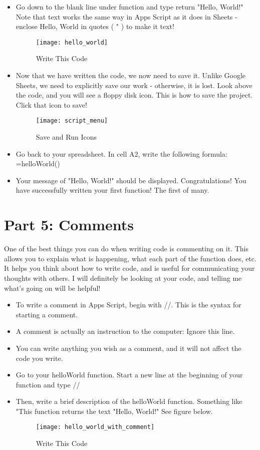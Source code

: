 \documentclass{article}
\begin{document}
\begin{itemize}
	\item Go down to the blank line under function and type return "Hello, World!"  Note that text works the same way in Apps Script as it does in Sheets - enclose Hello, World in quotes ( " ) to make it text!
	\begin{figure}[H]
  		\centering
  		\texttt{[image: hello\_world]}
  		\caption{Write This Code}
	\end{figure} 
	\item Now that we have written the code, we now need to save it.  Unlike Google Sheets, we need to explicitly save our work - otherwise, it is lost.  Look above the code, and you will see a floppy disk icon.  This is how to save the project.  Click that icon to save!
	\begin{figure}[H]
  \centering
  \texttt{[image: script\_menu]}
  \caption{Save and Run Icons}
\end{figure} 
	\item Go back to your spreadsheet.  In cell A2, write the following formula:  =helloWorld()
	\item Your message of "Hello, World!" should be displayed.  Congratulations!  You have successfully written your first function!  The first of many. 
\end{itemize}

\section*{Part 5: Comments}
One of the best things you can do when writing code is commenting on it.  This allows you to explain what is happening, what each part of the function does, etc.  It helps you think about how to write code, and is useful for communicating your thoughts with others.  I will definitely be looking at your code, and telling me what's going on will be helpful!
\begin{itemize}
	\item To write a comment in Apps Script, begin with //.  This is the syntax for starting a comment.
	\item A comment is actually an instruction to the computer:  Ignore this line.
	\item You can write anything you wish as a comment, and it will not affect the code you write.
	\item Go to your helloWorld function.  Start a new line at the beginning of your function and type //
	\item Then, write a brief description of the helloWorld function.  Something like "This function returns the text "Hello, World!"  See figure below.
	\begin{figure}[H]
  		\centering
  		\texttt{[image: hello\_world\_with\_comment]}
  		\caption{Write This Code}
	\end{figure}
\end{itemize}
\end{document}
